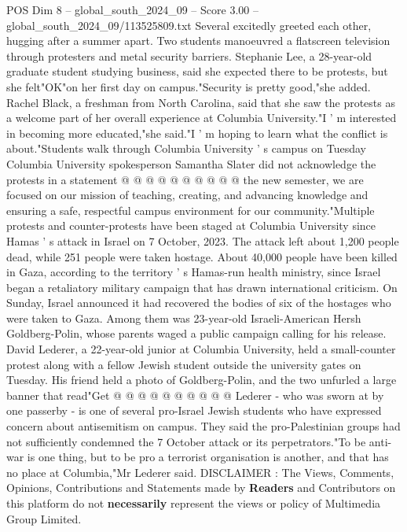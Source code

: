 \begin{textsample}{POS Dim 8 – global\_south\_2024\_09 – Score 3.00 – global\_south\_2024\_09/113525809.txt}
Several excitedly greeted each other, hugging after a summer apart.
Two students manoeuvred a flatscreen television through protesters and metal security barriers.
Stephanie Lee, a 28-year-old graduate student studying business, said she expected there to be protests, but she felt"OK"on her first day on campus."Security is pretty good,"she added.
Rachel Black, a freshman from North Carolina, said that she saw the protests as a welcome part of her overall experience at Columbia University."I ' m interested in becoming more educated,"she said."I ' m hoping to learn what the conflict is about."Students walk through Columbia University ' s campus on Tuesday Columbia University spokesperson Samantha Slater did not acknowledge the protests in a statement @ @ @ @ @ @ @ @ @ @ the new semester, we are focused on our mission of teaching, creating, and advancing knowledge and ensuring a safe, respectful campus environment for our community."Multiple protests and counter-protests have been staged at Columbia University since Hamas ' s attack in Israel on 7 October, 2023.
The attack left about 1,200 people dead, while 251 people were taken hostage.
About 40,000 people have been killed in Gaza, according to the territory ' s Hamas-run health ministry, since Israel began a retaliatory military campaign that has drawn international criticism.
On Sunday, Israel announced it had recovered the bodies of six of the hostages who were taken to Gaza.
Among them was 23-year-old Israeli-American Hersh Goldberg-Polin, whose parents waged a public campaign calling for his release.
David Lederer, a 22-year-old junior at Columbia University, held a small-counter protest along with a fellow Jewish student outside the university gates on Tuesday.
His friend held a photo of Goldberg-Polin, and the two unfurled a large banner that read"Get @ @ @ @ @ @ @ @ @ @ Lederer - who was sworn at by one passerby - is one of several pro-Israel Jewish students who have expressed concern about antisemitism on campus.
They said the pro-Palestinian groups had not sufficiently condemned the 7 October attack or its perpetrators."To be anti-war is one thing, but to be pro a terrorist organisation is another, and that has no place at Columbia,"Mr Lederer said.
DISCLAIMER : The Views, Comments, Opinions, Contributions and Statements made by \textbf{Readers} and Contributors on this platform do not \textbf{necessarily} represent the views or policy of Multimedia Group Limited.

\end{textsample}
